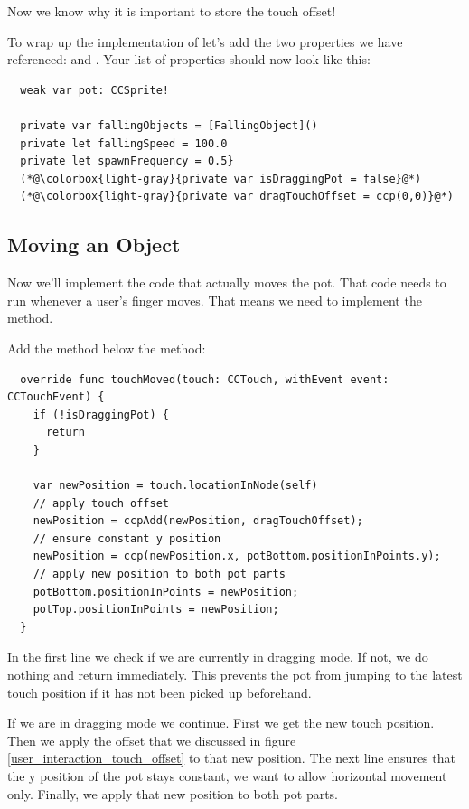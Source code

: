Now we know why it is important to store the touch offset!

\begin{leftbar}
To wrap up the implementation of  let's add the two
properties we have referenced:  and
. Your list of properties should now look like this:
\begin{lstlisting}
  weak var pot: CCSprite!
  
  private var fallingObjects = [FallingObject]()
  private let fallingSpeed = 100.0
  private let spawnFrequency = 0.5}
  (*@\colorbox{light-gray}{private var isDraggingPot = false}@*)
  (*@\colorbox{light-gray}{private var dragTouchOffset = ccp(0,0)}@*) 
\end{lstlisting}
\end{leftbar}

\subsection{Moving an Object}
Now we'll implement the code that actually moves the pot. That code needs to run
whenever a user's finger moves. That means we need to implement the
 method.
\begin{leftbar}
Add the  method below the  method:
\begin{lstlisting}
  override func touchMoved(touch: CCTouch, withEvent event: CCTouchEvent) {
    if (!isDraggingPot) {
      return
    }
    
    var newPosition = touch.locationInNode(self)
    // apply touch offset
    newPosition = ccpAdd(newPosition, dragTouchOffset);
    // ensure constant y position
    newPosition = ccp(newPosition.x, potBottom.positionInPoints.y);
    // apply new position to both pot parts
    potBottom.positionInPoints = newPosition;
    potTop.positionInPoints = newPosition;
  }
\end{lstlisting}
\end{leftbar}
In the first line we check if we are currently in dragging mode. If not, we do
nothing and return immediately. This prevents the pot from jumping to the latest
touch position if it has not been picked up beforehand.

If we are in dragging mode we continue. First we get the new touch position.
Then we apply the offset that we discussed in figure
\ref{user_interaction_touch_offset} to that new position. The next line ensures
that the y position of the pot stays constant, we want to allow horizontal
movement only. Finally, we apply that new position to both pot parts. 

